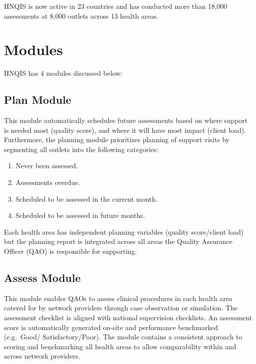 \documentclass[]{book}
\providecommand{\tightlist}{%
  \setlength{\itemsep}{0pt}\setlength{\parskip}{0pt}}
\begin{document}
HNQIS is now active in 23 countries and has conducted more than 18,000 assessments at 8,000 outlets across 13 health areas.

\hypertarget{modules}{%
\section{Modules}\label{modules}}

HNQIS has 4 modules discussed below:

\hypertarget{plan-module}{%
\subsection{Plan Module}\label{plan-module}}

This module automatically schedules future assessments based on where support is needed most (quality score), and where it will have most impact (client load). Furthermore, the planning module prioritizes planning of support visits by segmenting all outlets into the following categories:

\begin{enumerate}
\def\labelenumi{\arabic{enumi}.}
\tightlist
\item
  Never been assessed.
\item
  Assessments overdue.
\item
  Scheduled to be assessed in the current month.
\item
  Scheduled to be assessed in future months.
\end{enumerate}

Each health area has independent planning variables (quality score/client load) but the planning report is integrated across all areas the Quality Assurance Officer (QAO) is responsible for supporting.

\hypertarget{assess-module}{%
\subsection{Assess Module}\label{assess-module}}

This module enables QAOs to assess clinical procedures in each health area catered for by network providers through case observation or simulation. The assessment checklist is aligned with national supervision checklists. An assessment score is automatically generated on-site and performance benchmarked (e.g.~Good/ Satisfactory/Poor). The module contains a consistent approach to scoring and benchmarking all health areas to allow comparability within and across network providers.
\end{document}

